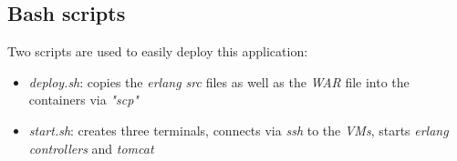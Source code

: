 \documentclass{article}
\begin{document}
\subsection{Bash scripts}
Two scripts are used to easily deploy this application:
\begin{itemize}
    \item \textit{deploy.sh}: copies the \textit{erlang src} files as well as the \textit{WAR} file into the containers via \textit{"scp"}
    \item \textit{start.sh}: creates three terminals, connects via \textit{ssh} to the \textit{VMs}, starts \textit{erlang controllers} and \textit{tomcat}
\end{itemize}
\end{document}
